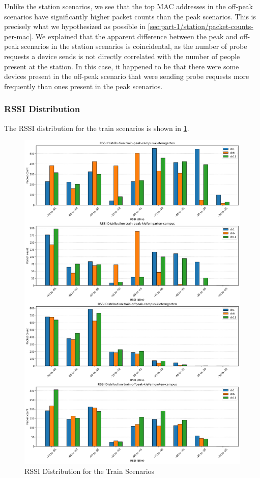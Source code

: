 \documentclass[sigconf,nonacm]{acmart}
\begin{document}
Unlike the station scenarios, we see that the top MAC addresses in the off-peak scenarios have significantly higher packet counts than the peak scenarios. This is precisely what we hypothesized as possible in \cref{sec:part-1/station/packet-counts-per-mac}. We explained that the apparent difference between the peak and off-peak scenarios in the station scenarios is coincidental, as the number of probe requests a device sends is not directly correlated with the number of people present at the station. In this case, it happened to be that there were some devices present in the off-peak scenario that were sending probe requests more frequently than ones present in the peak scenarios.

\subsubsection{RSSI Distribution}
\label{sec:part-1/train/rssi-distribution}

The RSSI distribution for the train scenarios is shown in \cref{fig:train_rssi_distribution}.
\begin{figure}
    \centering
    \includegraphics[width=\columnwidth]{images/part1/rssi/train-scenarios.png}
    \caption{RSSI Distribution for the Train Scenarios}
    \label{fig:train_rssi_distribution}
\end{figure}
\end{document}
